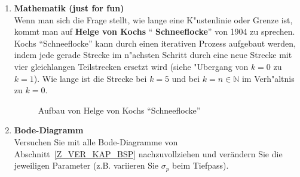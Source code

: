 {\begin{enumerate}
\item {\bf Mathematik (just for fun)}\\ Wenn man sich die Frage
  stellt, wie lange eine K"ustenlinie oder Grenze ist, kommt man auf
  {\bf Helge von Kochs} ``{\bf
    Schneeflocke}'' von 1904 zu sprechen.\\ Kochs
  ``Schneeflocke'' kann durch einen iterativen Prozess aufgebaut
  werden, indem jede gerade Strecke im n"achsten Schritt durch eine
  neue Strecke mit vier gleichlangen Teilstrecken ersetzt wird (siehe "Ubergang von
  $k=0$ zu $k=1$).  Wie lange ist die Strecke bei $k=5$ und bei
  $k=n\in\mathbb{N}$ im Verh"altnis zu $k=0$.
\begin{figure}[htb]
  \begin{center}\vspace*{+2mm}
  \vspace*{-1mm}\caption{Aufbau von Helge von Kochs ``Schneeflocke''}
\end{center}
 \end{figure}

\item {\bf Bode-Diagramm}\\ Versuchen Sie mit \matlogo{} alle Bode-Diagramme von Abschnitt~\ref{Z_VER_KAP_BSP} nachzuvollziehen und ver\"andern Sie die jeweiligen Parameter (z.B. variieren Sie $\sigma_p$ beim Tiefpass).
  


\end{enumerate}}
